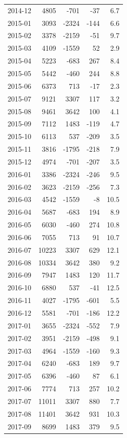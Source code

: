 \begin{longtable}{lrrrr}
2014-12 & 4805 & -701 & -37 & 6.7 \\
2015-01 & 3093 & -2324 & -144 & 6.6 \\
2015-02 & 3378 & -2159 & -51 & 9.7 \\
2015-03 & 4109 & -1559 & 52 & 2.9 \\
2015-04 & 5223 & -683 & 267 & 8.4 \\
2015-05 & 5442 & -460 & 244 & 8.8 \\
2015-06 & 6373 & 713 & -17 & 2.3 \\
2015-07 & 9121 & 3307 & 117 & 3.2 \\
2015-08 & 9461 & 3642 & 100 & 4.1 \\
2015-09 & 7112 & 1483 & -119 & 4.7 \\
2015-10 & 6113 & 537 & -209 & 3.5 \\
2015-11 & 3816 & -1795 & -218 & 7.9 \\
2015-12 & 4974 & -701 & -207 & 3.5 \\
2016-01 & 3386 & -2324 & -246 & 9.5 \\
2016-02 & 3623 & -2159 & -256 & 7.3 \\
2016-03 & 4542 & -1559 & -8 & 10.5 \\
2016-04 & 5687 & -683 & 194 & 8.9 \\
2016-05 & 6030 & -460 & 274 & 10.8 \\
2016-06 & 7055 & 713 & 91 & 10.7 \\
2016-07 & 10223 & 3307 & 629 & 12.1 \\
2016-08 & 10334 & 3642 & 380 & 9.2 \\
2016-09 & 7947 & 1483 & 120 & 11.7 \\
2016-10 & 6880 & 537 & -41 & 12.5 \\
2016-11 & 4027 & -1795 & -601 & 5.5 \\
2016-12 & 5581 & -701 & -186 & 12.2 \\
2017-01 & 3655 & -2324 & -552 & 7.9 \\
2017-02 & 3951 & -2159 & -498 & 9.1 \\
2017-03 & 4964 & -1559 & -160 & 9.3 \\
2017-04 & 6240 & -683 & 189 & 9.7 \\
2017-05 & 6396 & -460 & 87 & 6.1 \\
2017-06 & 7774 & 713 & 257 & 10.2 \\
2017-07 & 11011 & 3307 & 880 & 7.7 \\
2017-08 & 11401 & 3642 & 931 & 10.3 \\
2017-09 & 8699 & 1483 & 379 & 9.5 \\

\end{longtable}
